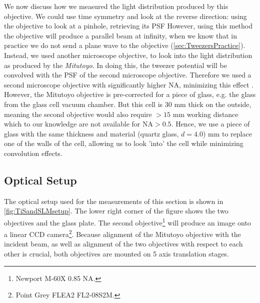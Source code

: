 We now discuss how we measured the light distribution produced by this objective.
We could use time symmetry and look at the reverse direction: using the objective to look at a pinhole, retrieving its \acf{PSF} \cite{Knottnerus2018,Sortais2007}
However, using this method the objective will produce a parallel beam at infinity, when we know that in practice we do not send a plane wave to the objective (\cref{sec:TweezersPractice}). 
Instead, we used another microscope objective, to look into the light distribution as produced by the \textit{Mitutoyo}. 
In doing this, the tweezer potential will be convolved with the \ac{PSF} of the second microscope objective.
Therefore we used a second microscope objective with significantly higher \ac{NA}, minimizing this effect \cite{Baumgaertner2017}. 
However, the Mitutoyo objective is pre-corrected for a piece of glass, e.g. the glass from the glass cell vacuum chamber. 
But this cell is 30 mm thick on the outside, meaning the second objective would also require $> 15$ mm working distance which to our knowledge are not available for $\text{NA}>0.5$.
Hence, we use a piece of glass with the same thickness and material (quartz glass, $d = 4.0$) mm to replace one of the walls of the cell, allowing us to look 'into' the cell while minimizing convolution effects.

\subsection{Optical Setup}

The optical setup used for the measurements of this section is shown in \cref{fig:TiSandSLMsetup}. The lower right corner of the figure shows the two objectives and the glass plate. 
The second objective\footnote{Newport M-60X 0.85 NA.} will produce an image onto a linear \ac{CCD} camera\footnote{Point Grey FLEA2 FL2-08S2M.}. 
Because alignment of the Mitutoyo objective with the incident beam, as well as alignment of the two objectives with respect to each other is crucial, both objectives are mounted on 5 axis translation stages.

